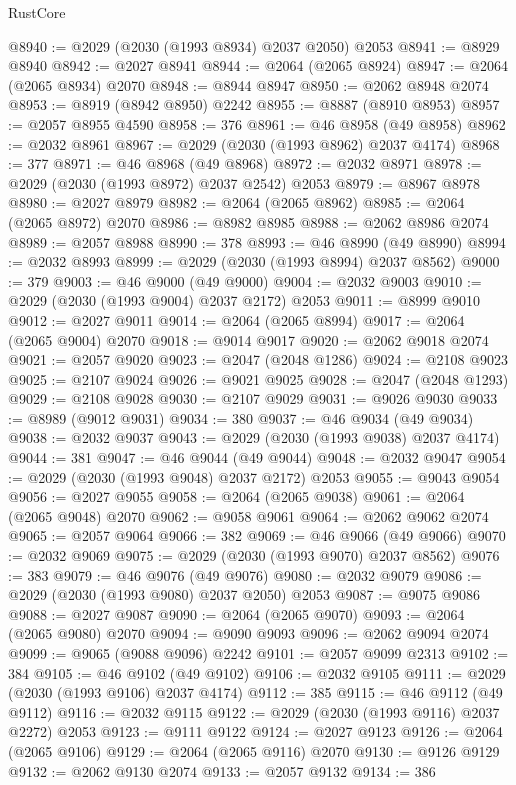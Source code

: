 \begin{lexlean}{RustCore}
\begin{coremodule}
@8940 := @2029 (@2030 (@1993 @8934) @2037 @2050) @2053
@8941 := @8929 @8940
@8942 := @2027 @8941
@8944 := @2064 (@2065 @8924)
@8947 := @2064 (@2065 @8934) @2070
@8948 := @8944 @8947
@8950 := @2062 @8948 @2074
@8953 := @8919 (@8942 @8950) @2242
@8955 := @8887 (@8910 @8953)
@8957 := @2057 @8955 @4590
@8958 := 376
@8961 := @46 @8958 (@49 @8958)
@8962 := @2032 @8961
@8967 := @2029 (@2030 (@1993 @8962) @2037 @4174)
@8968 := 377
@8971 := @46 @8968 (@49 @8968)
@8972 := @2032 @8971
@8978 := @2029 (@2030 (@1993 @8972) @2037 @2542) @2053
@8979 := @8967 @8978
@8980 := @2027 @8979
@8982 := @2064 (@2065 @8962)
@8985 := @2064 (@2065 @8972) @2070
@8986 := @8982 @8985
@8988 := @2062 @8986 @2074
@8989 := @2057 @8988
@8990 := 378
@8993 := @46 @8990 (@49 @8990)
@8994 := @2032 @8993
@8999 := @2029 (@2030 (@1993 @8994) @2037 @8562)
@9000 := 379
@9003 := @46 @9000 (@49 @9000)
@9004 := @2032 @9003
@9010 := @2029 (@2030 (@1993 @9004) @2037 @2172) @2053
@9011 := @8999 @9010
@9012 := @2027 @9011
@9014 := @2064 (@2065 @8994)
@9017 := @2064 (@2065 @9004) @2070
@9018 := @9014 @9017
@9020 := @2062 @9018 @2074
@9021 := @2057 @9020
@9023 := @2047 (@2048 @1286)
@9024 := @2108 @9023
@9025 := @2107 @9024
@9026 := @9021 @9025
@9028 := @2047 (@2048 @1293)
@9029 := @2108 @9028
@9030 := @2107 @9029
@9031 := @9026 @9030
@9033 := @8989 (@9012 @9031)
@9034 := 380
@9037 := @46 @9034 (@49 @9034)
@9038 := @2032 @9037
@9043 := @2029 (@2030 (@1993 @9038) @2037 @4174)
@9044 := 381
@9047 := @46 @9044 (@49 @9044)
@9048 := @2032 @9047
@9054 := @2029 (@2030 (@1993 @9048) @2037 @2172) @2053
@9055 := @9043 @9054
@9056 := @2027 @9055
@9058 := @2064 (@2065 @9038)
@9061 := @2064 (@2065 @9048) @2070
@9062 := @9058 @9061
@9064 := @2062 @9062 @2074
@9065 := @2057 @9064
@9066 := 382
@9069 := @46 @9066 (@49 @9066)
@9070 := @2032 @9069
@9075 := @2029 (@2030 (@1993 @9070) @2037 @8562)
@9076 := 383
@9079 := @46 @9076 (@49 @9076)
@9080 := @2032 @9079
@9086 := @2029 (@2030 (@1993 @9080) @2037 @2050) @2053
@9087 := @9075 @9086
@9088 := @2027 @9087
@9090 := @2064 (@2065 @9070)
@9093 := @2064 (@2065 @9080) @2070
@9094 := @9090 @9093
@9096 := @2062 @9094 @2074
@9099 := @9065 (@9088 @9096) @2242
@9101 := @2057 @9099 @2313
@9102 := 384
@9105 := @46 @9102 (@49 @9102)
@9106 := @2032 @9105
@9111 := @2029 (@2030 (@1993 @9106) @2037 @4174)
@9112 := 385
@9115 := @46 @9112 (@49 @9112)
@9116 := @2032 @9115
@9122 := @2029 (@2030 (@1993 @9116) @2037 @2272) @2053
@9123 := @9111 @9122
@9124 := @2027 @9123
@9126 := @2064 (@2065 @9106)
@9129 := @2064 (@2065 @9116) @2070
@9130 := @9126 @9129
@9132 := @2062 @9130 @2074
@9133 := @2057 @9132
@9134 := 386

\end{coremodule}
\end{lexlean}
